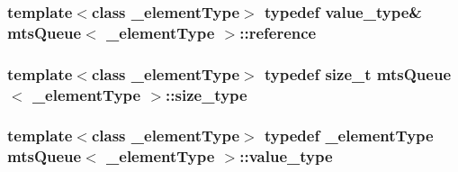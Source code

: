 \hypertarget{classmts_queue_ac59cdd255fe34f580085d58030887439}{
\subsubsection[{reference}]{\setlength{\rightskip}{0pt plus 5cm}template$<$class \-\_\-element\-Type$>$ typedef {\bf value\-\_\-type}\& {\bf mts\-Queue}$<$ \-\_\-element\-Type $>$\-::{\bf reference}}}\label{classmts_queue_ac59cdd255fe34f580085d58030887439}
\hypertarget{classmts_queue_a41b33537b89ae654421ba5e7c9893ed2}{
\subsubsection[{size\-\_\-type}]{\setlength{\rightskip}{0pt plus 5cm}template$<$class \-\_\-element\-Type$>$ typedef size\-\_\-t {\bf mts\-Queue}$<$ \-\_\-element\-Type $>$\-::{\bf size\-\_\-type}}}\label{classmts_queue_a41b33537b89ae654421ba5e7c9893ed2}
\hypertarget{classmts_queue_a041a2b244150e58247ee55039e0bb00f}{
\subsubsection[{value\-\_\-type}]{\setlength{\rightskip}{0pt plus 5cm}template$<$class \-\_\-element\-Type$>$ typedef \-\_\-element\-Type {\bf mts\-Queue}$<$ \-\_\-element\-Type $>$\-::{\bf value\-\_\-type}}}\label{classmts_queue_a041a2b244150e58247ee55039e0bb00f}


